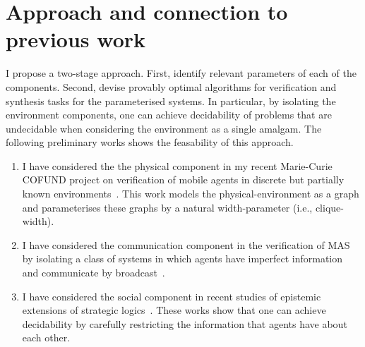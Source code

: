 \documentclass[a4paper,10pt]{article}
\begin{document}
% 


\section{Approach and connection to previous work}

I propose a two-stage approach. First, identify relevant parameters of each of the components. Second, devise provably optimal algorithms for verification and synthesis tasks for the parameterised systems. In particular, by isolating the environment components, one can achieve decidability of problems that are undecidable when considering the environment as a single amalgam. The following preliminary works shows the feasability of this approach. 
\begin{enumerate}
 \item I have considered the the physical component in my recent Marie-Curie COFUND project on verification of mobile agents in discrete but partially known environments~\cite{Rubin15AAMAS,RZMA15,AMRZ16AAMAS}. This work models the physical-environment as a graph and parameterises these graphs by a natural width-parameter (i.e., clique-width).
\item I have considered the communication component in the verification of MAS by isolating a class of systems in which agents have imperfect information and communicate by broadcast~\cite{DBLP:conf/lpar/AminofRZ15,BLMR17,BLMR17IJCAI}. 
\item I have considered the social component in recent studies of epistemic extensions of strategic logics~\cite{BMMRV17,BLMR17IJCAI}. These works show 
that one can achieve decidability by carefully restricting the information that agents have about each other.
\end{enumerate}
\end{document}
